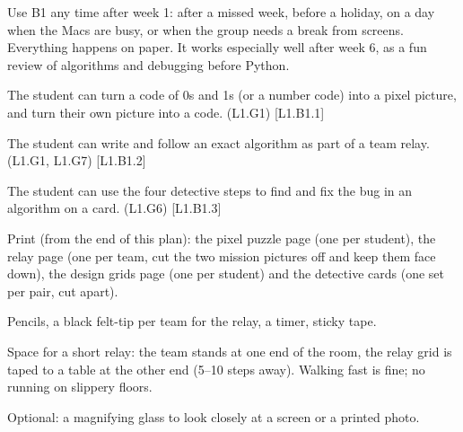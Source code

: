 
\begin{teachernote}
Use B1 any time after week 1: after a missed week, before a holiday, on a day when the Macs are busy, or when the group needs a break from screens. Everything happens on paper. It works especially well after week 6, as a fun review of algorithms and debugging before Python.
\end{teachernote}

\begin{objectives}
  \item The student can turn a code of 0s and 1s (or a number code) into a pixel picture, and turn their own picture into a code. (L1.G1) [L1.B1.1]
  \item The student can write and follow an exact algorithm as part of a team relay. (L1.G1, L1.G7) [L1.B1.2]
  \item The student can use the four detective steps to find and fix the bug in an algorithm on a card. (L1.G6) [L1.B1.3]
\end{objectives}

\begin{materials}
  \item Print (from the end of this plan): the pixel puzzle page (one per student), the relay page (one per team, cut the two mission pictures off and keep them face down), the design grids page (one per student) and the detective cards (one set per pair, cut apart).
  \item Pencils, a black felt-tip per team for the relay, a timer, sticky tape.
  \item Space for a short relay: the team stands at one end of the room, the relay grid is taped to a table at the other end (5--10 steps away). Walking fast is fine; no running on slippery floors.
  \item Optional: a magnifying glass to look closely at a screen or a printed photo.
\end{materials}

